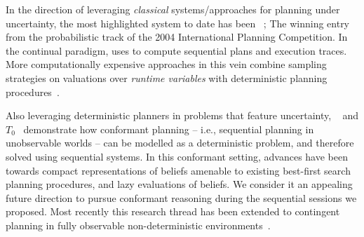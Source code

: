 






In the direction of leveraging {\em classical} systems/approaches for
planning under uncertainty, the most highlighted system to date has
been ~\cite{yoon:etal:2007}; The winning entry from
the probabilistic track of the 2004 International Planning
Competition.  In the continual paradigm, 
uses  to compute sequential plans and execution traces.
More computationally expensive approaches in this vein combine
sampling strategies on valuations over {\em runtime variables} with
deterministic planning procedures~\cite{yoon:etal:2008}. %

Also leveraging deterministic planners in problems that feature
uncertainty, ~\cite{hoffmann:brafman:2006} and
$T_0$~\cite{palacios:geffner:2009} demonstrate how conformant planning
-- i.e., sequential planning in unobservable worlds -- can be modelled
as a deterministic problem, and therefore solved using sequential
systems. In this conformant setting, advances have been towards
compact representations of beliefs amenable to existing best-first
search planning procedures, and lazy evaluations of beliefs. We
consider it an appealing future direction to pursue conformant
reasoning during the sequential sessions we proposed. Most recently
this research thread has been extended to contingent planning in fully
observable non-deterministic environments~\cite{albore:etal:2009}.
